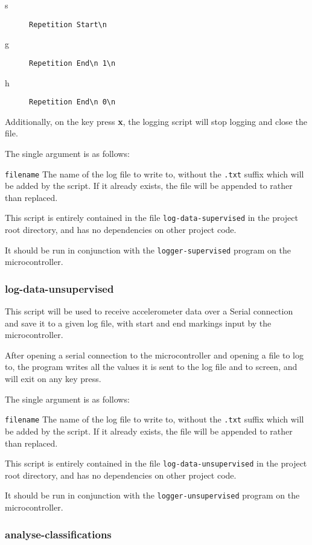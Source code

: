 \documentclass[a4paper]{article}
\begin{document}
\begin{description}
\item[s] \lstinline|Repetition Start\n|
\item[g] \lstinline|Repetition End\n 1\n|
\item[h] \lstinline|Repetition End\n 0\n|
\end{description}

Additionally, on the key press \textbf{x}, the logging script will stop logging and close the file.

The single argument is as follows:

\lstinline{filename} The name of the log file to write to, without the \lstinline{.txt} suffix which will be added by the script. If it already exists, the file will be appended to rather than replaced.

This script is entirely contained in the file \lstinline{log-data-supervised} in the project root directory, and has no dependencies on other project code.

It should be run in conjunction with the \lstinline{logger-supervised} program on the microcontroller.

\subsubsection{log-data-unsupervised}
\label{subsubsec:dc_csa_logunsupervised}

This script will be used to receive accelerometer data over a Serial connection and save it to a given log file, with start and end markings input by the microcontroller.

After opening a serial connection to the microcontroller and opening a file to log to, the program writes all the values it is sent to the log file and to screen, and will exit on any key press.

The single argument is as follows:

\lstinline{filename} The name of the log file to write to, without the \lstinline{.txt} suffix which will be added by the script. If it already exists, the file will be appended to rather than replaced.

This script is entirely contained in the file \lstinline{log-data-unsupervised} in the project root directory, and has no dependencies on other project code.

It should be run in conjunction with the \lstinline{logger-unsupervised} program on the microcontroller.

\subsubsection{analyse-classifications}
\label{subsubsec:dc_csa_analyse}
\end{document}
